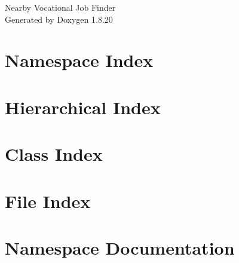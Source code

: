 \let\mypdfximage\pdfximage\def\pdfximage{\immediate\mypdfximage}\documentclass[twoside]{book}
\newcommand{\+}{\discretionary{\mbox{\scriptsize$\hookleftarrow$}}{}{}}
\newcommand{\clearemptydoublepage}{%
  \newpage{\pagestyle{empty}\cleardoublepage}%
}
\begin{document}
\hypersetup{pageanchor=false,
             bookmarksnumbered=true,
             pdfencoding=unicode
            }
\begin{titlepage}
\vspace*{7cm}
\begin{center}%
{\Large Nearby Vocational Job Finder }\\
\vspace*{1cm}
{\large Generated by Doxygen 1.8.20}\\
\end{center}
\end{titlepage}
\clearemptydoublepage
{}
\tableofcontents
\clearemptydoublepage
{}
\hypersetup{pageanchor=true}

\chapter{Namespace Index}

\chapter{Hierarchical Index}

\chapter{Class Index}

\chapter{File Index}

\chapter{Namespace Documentation}



































\end{document}
